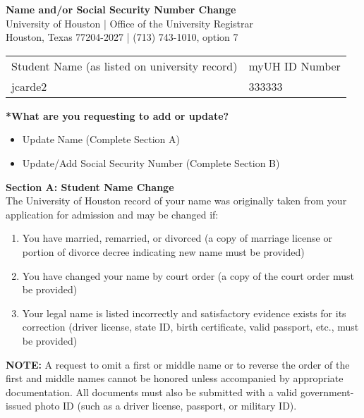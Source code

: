 \documentclass[12pt]{article}
\newcommand{\CheckedBox}[1]{%
  \ifthenelse{\equal{#1}{yes}}{$\boxtimes$}{$\square$}%
}
\begin{document}
\begin{center}
\textbf{Name and/or Social Security Number Change}\\
University of Houston | Office of the University Registrar\\
Houston, Texas 77204-2027 | (713) 743-1010, option 7
\end{center}

\vspace{1em}
\noindent\begin{tabular}{@{}p{}p{}@{}}
Student Name (as listed on university record) & myUH ID Number\\
jcarde2 & 333333\\
\end{tabular}

\vspace{1em}
\noindent\textbf{*What are you requesting to add or update?}\\
\begin{itemize}[leftmargin=0.7cm]
	\item \CheckedBox{no} Update Name (Complete Section A)
	\item \CheckedBox{yes} Update/Add Social Security Number (Complete Section B)
\end{itemize}

\vspace{1em}
\noindent\textbf{Section A: Student Name Change}\\
The University of Houston record of your name was originally taken from your application for admission and may be changed if:
\begin{enumerate}
\item You have married, remarried, or divorced (a copy of marriage license or portion of divorce decree indicating new name must be provided)
\item You have changed your name by court order (a copy of the court order must be provided)
\item Your legal name is listed incorrectly and satisfactory evidence exists for its correction (driver license, state ID, birth certificate, valid passport, etc., must be provided)
\end{enumerate}

\noindent\textbf{NOTE:} A request to omit a first or middle name or to reverse the order of the first and middle names cannot be honored unless accompanied by appropriate documentation. All documents must also be submitted with a valid government-issued photo ID (such as a driver license, passport, or military ID).
\end{document}
